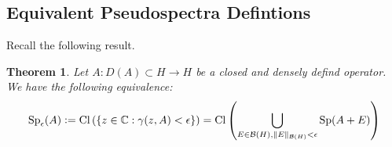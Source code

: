 \documentclass[12pt,a4paper]{article}
\newcommand{\defeq}{\vcentcolon=}
\newcommand{\Spe}[1]{\operatorname{Sp}_{\epsilon}\!\left(#1\right)}
\theoremstyle{boldthm}
\newtheorem{theorem}{Theorem}[section]
\theoremstyle{bolddefn}
\begin{document}
\subsection{Equivalent Pseudospectra Defintions}

Recall the following result.

\begin{theorem}
    Let $A:D(A) \subset H \rightarrow H$ be a closed and densely defind operator. We have the following equivalence:
    \begin{equation}
        \Spe{A} \defeq \operatorname{Cl}\left( \left\{ z \in \mathbb{C} : \gamma(z, A) < \epsilon  \right\} \right) =  \operatorname{Cl} \left( \bigcup_{E \in \mathcal{B}(H), \|E\|_{\mathcal{B}(H)} < \epsilon} \operatorname{Sp}(A+E) \right)
    \end{equation}
\end{theorem}
\end{document}
